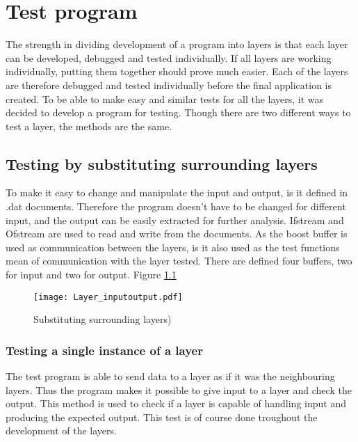 
\chapter{Test program}\label{chap:test}


The strength in dividing development of a program into layers is that each layer can be developed, debugged and tested individually. If all layers are working individually, putting them together should prove much easier. Each of the layers are therefore debugged and tested individually before the final application is created. To be able to make easy and similar tests for all the layers, it was decided to develop a program for testing. Though there are two different ways to test a layer, the methods are the same.

\section{Testing by substituting surrounding layers}
To make it easy to change and manipulate the input and output, is it defined in .dat documents. Therefore the program doesn't have to be changed for different input, and the output can be easily extracted for further analysis. Ifstream and Ofstream are used to read and write from the documents. 
As the boost buffer is used as communication between the layers, is it also used as the test functions mean of communication with the layer tested. There are defined four buffers, two for input and two for output.
Figure \ref{fig:Layer_inputoutput}

\begin{figure}[htb]
	\begin{center}
	\texttt{[image: Layer\_inputoutput.pdf]}
	\caption{Substituting surrounding layers)}
	\label{fig:Layer_inputoutput}	
	\end{center}
\end{figure}

\subsection{Testing a single instance of a layer}  

 The test program is able to send data to a layer as if it was the neighbouring layers. Thus the program makes it possible to give input to a layer and check the output. This method is used to check if a layer is capable of  handling input and producing the expected output. This test is of course done troughout the development of the layers.


